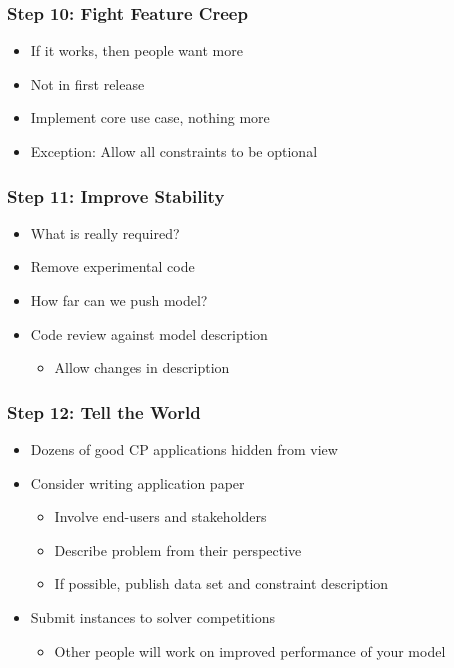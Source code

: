 \begin{frame}
\frametitle{Step 10: Fight Feature Creep}
\begin{itemize}
\item If it works, then people want more
\item Not in first release
\item Implement core use case, nothing more
  \item Exception: Allow all constraints to be optional
\end{itemize}
\end{frame}

\begin{frame}
\frametitle{Step 11: Improve Stability}
\begin{itemize}
  \item What is really required?
  \item Remove experimental code
  \item How far can we push model?
  \item Code review against model description
    \begin{itemize}
      \item Allow changes in description
    
\end{itemize}
\end{itemize}
\end{frame}

\begin{frame}
\frametitle{Step 12: Tell the World}
\begin{itemize}
\item Dozens of good CP applications hidden from view
\item Consider writing application paper
  \begin{itemize}
    \item Involve end-users and stakeholders
    \item Describe problem from their perspective
    \item If possible, publish data set and constraint description      
  \end{itemize}
\item Submit instances to solver competitions
  \begin{itemize}
    \item Other people will work on improved performance of your model
\end{itemize}
\end{itemize}
\end{frame}

